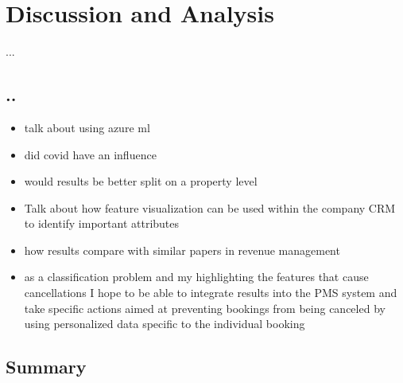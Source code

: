 \chapter{Discussion and Analysis}
...

\section{..}
\begin{itemize}
\item talk about using azure ml 
\item did covid have an influence
\item would results be better split on a property level
\item Talk about how feature visualization can be used within the company CRM to identify important attributes 
\item how results compare with similar papers in revenue management 
\item as a classification problem and my highlighting the features that cause cancellations I hope to be able to integrate results into the PMS system and take specific actions aimed at preventing bookings from being canceled by using personalized data specific to the individual booking
\end{itemize}










\section{Summary}
